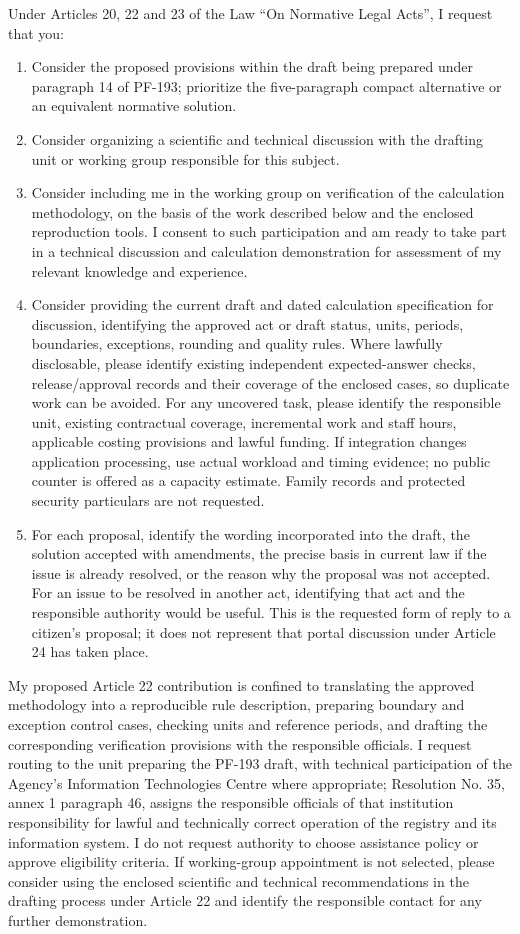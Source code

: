 \documentclass[14pt,a4paper]{extarticle}
\begin{document}
Under Articles 20, 22 and 23 of the Law “On Normative Legal Acts”, I request that you:
\begin{enumerate}
\item Consider the proposed provisions within the draft being prepared under paragraph 14 of PF-193; prioritize the five-paragraph compact alternative or an equivalent normative solution.
\item Consider organizing a scientific and technical discussion with the drafting unit or working group responsible for this subject.
\item Consider including me in the working group on verification of the calculation methodology, on the basis of the work described below and the enclosed reproduction tools. I consent to such participation and am ready to take part in a technical discussion and calculation demonstration for assessment of my relevant knowledge and experience.
\item Consider providing the current draft and dated calculation specification for discussion, identifying the approved act or draft status, units, periods, boundaries, exceptions, rounding and quality rules. Where lawfully disclosable, please identify existing independent expected-answer checks, release/approval records and their coverage of the enclosed cases, so duplicate work can be avoided. For any uncovered task, please identify the responsible unit, existing contractual coverage, incremental work and staff hours, applicable costing provisions and lawful funding. If integration changes application processing, use actual workload and timing evidence; no public counter is offered as a capacity estimate. Family records and protected security particulars are not requested.
\item For each proposal, identify the wording incorporated into the draft, the solution accepted with amendments, the precise basis in current law if the issue is already resolved, or the reason why the proposal was not accepted. For an issue to be resolved in another act, identifying that act and the responsible authority would be useful. This is the requested form of reply to a citizen’s proposal; it does not represent that portal discussion under Article 24 has taken place.
\end{enumerate}
My proposed Article 22 contribution is confined to translating the approved methodology into a reproducible rule description, preparing boundary and exception control cases, checking units and reference periods, and drafting the corresponding verification provisions with the responsible officials. I request routing to the unit preparing the PF-193 draft, with technical participation of the Agency’s Information Technologies Centre where appropriate; Resolution No. 35, annex 1 paragraph 46, assigns the responsible officials of that institution responsibility for lawful and technically correct operation of the registry and its information system. I do not request authority to choose assistance policy or approve eligibility criteria. If working-group appointment is not selected, please consider using the enclosed scientific and technical recommendations in the drafting process under Article 22 and identify the responsible contact for any further demonstration.
\end{document}

